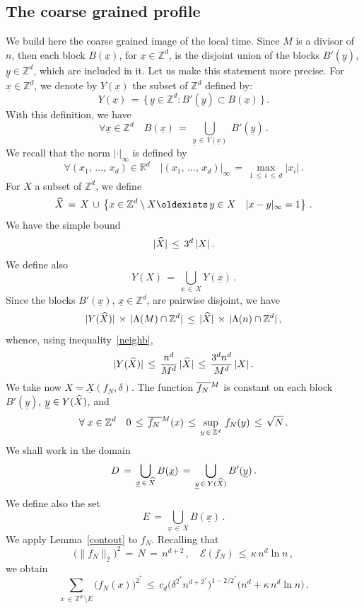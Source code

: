 \documentclass[AHL, Unicode, longabstracts, published]{cedram}
\newcommand{\ex}{{\exists\, }}
\newcommand{\XX}{{\underline{X}}}
\newcommand{\xx}{{\underline{x}}}
\newcommand{\yy}{{\underline{y}}}
\newcommand*\fmn{\overline{f_N\,}^{\lower2pt\hbox{$\scriptstyle M$}}}
\newcommand*\Zd {{\mathbb Z^d}}
\newcommand*\Rd {{\mathbb R^d}}
\newcommand*\hX{\smash{\widehat X}}
\newcommand*\La {{\Lambda}}
\newcommand{\cE}{\mathcal{E}}
\renewcommand*{\exists}{\mathrel{\oldexists}}
\let\oldforall\forall
\renewcommand*{\forall}{\mathrel{\oldforall}}
\begin{document}
\subsection{The coarse grained profile}\label{coars}
We build here the coarse grained image of the local time. Since $M$ is a divisor of $n$, then each block $B(\xx)$, for $\xx\in\Zd$, is the disjoint union of the blocks $B'(\yy)$, $\yy\in\Zd$, which are included in it. Let us make this statement more precise. For $\xx\in\Zd$, we denote by $Y(\xx)$ the subset of $\Zd$ defined by:
\[
Y(\xx)\,=\,\big\{\,\yy\in\Zd:B'(\yy)\subset B(\xx)\,\big\}\,.
\]
With this definition, we have
\[
\forall \xx\in\Zd\quad
B(\xx)\,=\,\bigcup_{\yy\,\in\,Y(\xx)}\;B'(\yy)\,.
\]
We recall that the norm $|\cdot|_\infty$ is defined by
\[
\forall (x_1,\,\dots,\,x_d)\in\Rd\quad
|(x_1,\,\dots,\,x_d)|_\infty\,=\,
{\max_{1\,\leq\,i\,\leq\,d}|x_i|}\,.
\]
For $X$ a subset of $\Zd$, we define
\[
\hX\,=\,X\,\cup\,
\left\{ x\in \Zd \setminus X \ex y\in X\quad |x-y|_\infty=1 \right\}\,.
\]
We have the simple bound
\begin{equation}\label{neighb}
|\hX|\,\leq \,3^d\, |X|\,.
\end{equation}
We define also
\[
Y(X)\,=\,\bigcup_{\xx\,\in\,X}Y(\xx)\,.
\]
Since the blocks $B'(\xx)$, $\xx\in\Zd$, are pairwise disjoint, we have
\[
|Y(\hX)|\,\times\,|\La(M)\cap\Zd|\,\leq\,
|\hX|\,\times\,|\La(n)\cap\Zd|\,,
\]
whence, using inequality~\eqref{neighb},
\begin{equation}\label{heb}
|Y(\hX)|\,\leq\,
\frac{n^d}{M^d}\,|\hX|
\,\leq\,
\frac{3^dn^d}{M^d}\,|X|
\,.
\end{equation}
We take now $X=\XX(f_N,\delta)$. The function $\fmn$ is constant on each block $B'(\yy)$, $\yy\in Y(\hX)$, and
\[
\forall x\in \Zd\quad
0\,\leq\,\fmn(x)\,\leq\,
\sup_{y\,\in\,\Zd}\,f_N(y)\,\leq\,\sqrt{N}\,.
\]
We shall work in the domain
\begin{equation}\label{bad}
D\,=\,\bigcup_{\xx\,\in\,\hX}B(\xx)\,=\,
\bigcup_{\yy\,\in\,Y(\hX)}B'(\yy)\,.
\end{equation}
We define also the set
\begin{equation}\label{bod}
E\,=\,\bigcup_{\xx\,\in\,X}B(\xx)\,.
\end{equation}
We apply Lemma~\ref{contout} to $f_N$. Recalling that
\[
\big(\|f_N\|_{2}\big)^2\,=\,N\,=\,n^{d+2}\,,\quad
\cE(f_N)\,\leq\,\kappa\,n^d\ln n\,,
\]
we obtain
\begin{equation}\label{outd}
\sum_{x\,\in\,
\Zd\,\setminus E}
\big(f_N(x)\big)^{2^*}\,\leq\, c_d\big(
\delta^{2^*} n^{d+2^*}
\big)^{1-2/2^*}
\big(n^d+ {\kappa \,n^d\ln n}
\big)\,.
\end{equation}
\end{document}
